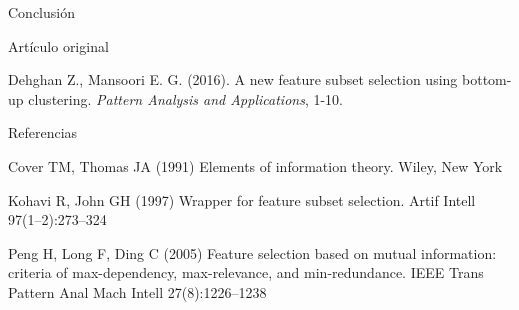 \documentclass[final]{beamer}
\newlength{\onecolwid}
\begin{document}
\begin{frame}[t]
\begin{columns}[t]
\begin{column}{\onecolwid}
\begin{block}{Conclusión}
\end{block}


\begin{block}{Artículo original}

Dehghan Z., Mansoori E. G. (2016). A new feature subset selection using bottom-up clustering. \textit{Pattern Analysis and Applications}, 1-10.

\end{block}



\begin{block}{Referencias}
\nocite{*} %
\small{}
\begin{thebibliography}{}

Cover TM, Thomas JA (1991) Elements of information theory. Wiley, New York

Kohavi R, John GH (1997) Wrapper for feature subset selection. Artif Intell 97(1–2):273–324

Peng H, Long F, Ding C (2005) Feature selection based on mutual information: criteria of max-dependency, max-relevance, and min-redundance. IEEE Trans Pattern Anal Mach Intell 27(8):1226–1238

\end{thebibliography}

\end{block}




\end{column}
\end{columns}
\end{frame}
\end{document}
